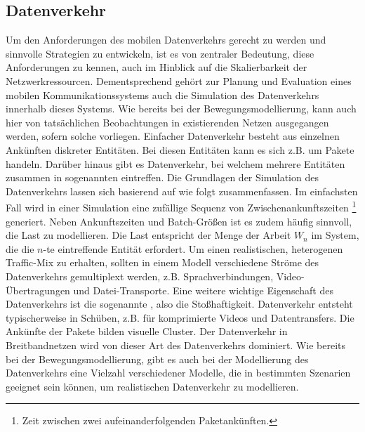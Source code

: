 \documentclass[12pt, a4paper]{article}
\begin{document}
\subsection{Datenverkehr}
\label{sec:traffic}

Um den Anforderungen des mobilen Datenverkehrs gerecht zu werden und sinnvolle Strategien zu entwickeln,
ist es von zentraler Bedeutung, diese Anforderungen zu kennen, auch im Hinblick auf die Skalierbarkeit der
Netzwerkressourcen. \cite{Oliveira2014} Dementsprechend gehört zur Planung und Evaluation eines mobilen 
Kommunikationssystems auch die Simulation des Datenverkehrs innerhalb dieses Systems. Wie bereits bei der
Bewegungsmodellierung, kann auch hier von tatsächlichen 
Beobachtungen in existierenden Netzen ausgegangen werden, sofern solche vorliegen.\newline
Einfacher Datenverkehr besteht aus einzelnen Ankünften diskreter Entitäten.
Bei diesen Entitäten kann es sich z.B. um Pakete handeln. Darüber hinaus gibt es Datenverkehr, 
bei welchem mehrere Entitäten zusammen in sogenannten  eintreffen. \cite{Frost1994}
Die Grundlagen der Simulation des Datenverkehrs lassen sich basierend auf \cite{Frost1994} wie folgt zusammenfassen.
Im einfachsten Fall wird in einer Simulation eine zufällige Sequenz von Zwischenankunftszeiten \footnote{Zeit zwischen zwei 
aufeinanderfolgenden Paketankünften.} generiert. Neben Ankunftszeiten und Batch-Größen ist es zudem häufig sinnvoll,
die Last zu modellieren. Die Last entspricht der Menge der Arbeit $W_n$ im System, die die $n$-te eintreffende Entität 
erfordert.
Um einen realistischen, heterogenen Traffic-Mix zu erhalten, sollten in einem Modell verschiedene
Ströme des Datenverkehrs gemultiplext werden, z.B. Sprachverbindungen, Video-Übertragungen und Datei-Transporte.
\newline\newline
Eine weitere wichtige Eigenschaft des Datenverkehrs ist die sogenannte , also die Stoßhaftigkeit.
Datenverkehr entsteht typischerweise in Schüben, z.B. für komprimierte Videos und Datentransfers. Die Ankünfte der Pakete
bilden visuelle Cluster. Der Datenverkehr in Breitbandnetzen wird von dieser Art des Datenverkehrs dominiert. \cite{Frost1994}
Wie bereits bei der Bewegungsmodellierung, gibt es auch bei der Modellierung des Datenverkehrs eine Vielzahl verschiedener
Modelle, die in bestimmten Szenarien geeignet sein können, um realistischen Datenverkehr zu modellieren.
\end{document}
